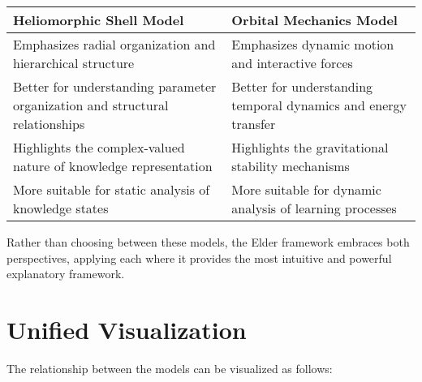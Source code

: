 \begin{tcolorbox}[colback=TheoremBlue, colframe=DarkSkyBlue, title=Complementary Model Strengths, fonttitle=\bfseries\large]
\begin{tabular}{p{} | p{}}
\textbf{Heliomorphic Shell Model} & \textbf{Orbital Mechanics Model} \\
\hline
Emphasizes radial organization and hierarchical structure & Emphasizes dynamic motion and interactive forces \\
\hline
Better for understanding parameter organization and structural relationships & Better for understanding temporal dynamics and energy transfer \\
\hline
Highlights the complex-valued nature of knowledge representation & Highlights the gravitational stability mechanisms \\
\hline
More suitable for static analysis of knowledge states & More suitable for dynamic analysis of learning processes \\
\end{tabular}
\end{tcolorbox}

Rather than choosing between these models, the Elder framework embraces both perspectives, applying each where it provides the most intuitive and powerful explanatory framework.

\section{Unified Visualization}

The relationship between the models can be visualized as follows:

